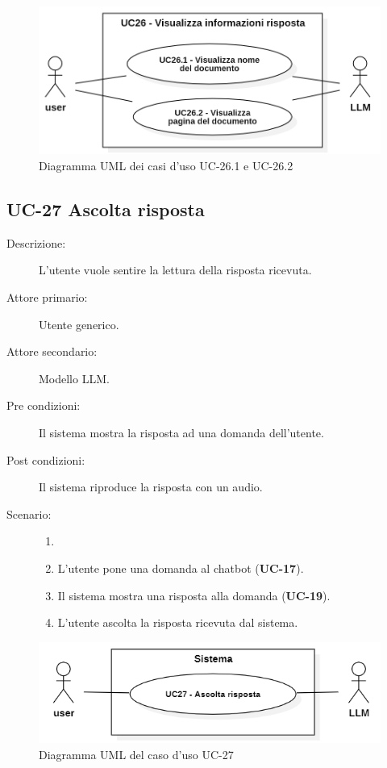 \begin{figure}[H]
    \centering
    \includegraphics[width=0.9\linewidth]{UC26.1.PNG} 
    \caption{Diagramma UML dei casi d'uso UC-26.1 e UC-26.2}
\end{figure}

\subsection{UC-27 Ascolta risposta}
\begin{description}
    \item[Descrizione:] L'utente vuole sentire la lettura della risposta ricevuta.
    \item[Attore primario:] Utente generico.
    \item[Attore secondario:] Modello LLM.
    \item[Pre condizioni:] Il sistema mostra la risposta ad una domanda dell'utente.
    \item[Post condizioni:] Il sistema riproduce la risposta con un audio.
    \item[Scenario:]
    \begin{enumerate}
        \item[]
        \item L’utente pone una domanda al chatbot (\textbf{UC-17}).
        \item Il sistema mostra una risposta alla domanda (\textbf{UC-19}).
        \item L'utente ascolta la risposta ricevuta dal sistema.
    \end{enumerate}
\end{description}

\begin{figure}[H]
    \centering
    \includegraphics[width=0.9\linewidth]{UC27.png} 
    \caption{Diagramma UML del caso d'uso UC-27}
\end{figure}